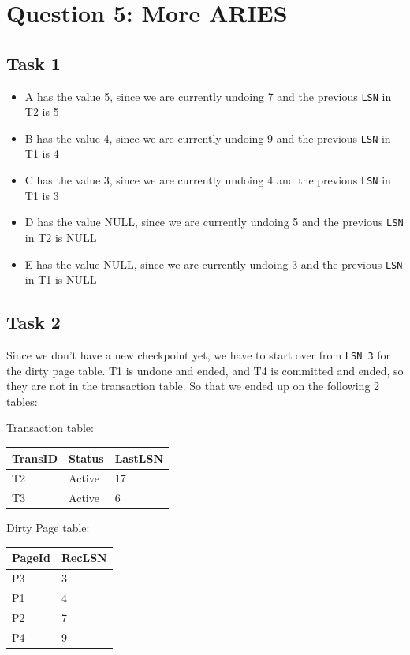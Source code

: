 \documentclass[12pt,a4paper]{article}
\begin{document}
\section{Question 5: More ARIES}
\subsection{Task 1}
\begin{itemize}
	\item A has the value 5, since we are currently undoing 7 and the previous \texttt{LSN} in T2 is 5	
	\item B has the value 4, since we are currently undoing 9 and the previous \texttt{LSN} in T1 is 4
	\item C has the value 3, since we are currently undoing 4 and the previous \texttt{LSN} in T1 is 3
	\item D has the value NULL, since we are currently undoing 5 and the previous \texttt{LSN} in T2 is NULL
	\item E has the value NULL, since we are currently undoing 3 and the previous \texttt{LSN} in T1 is NULL
\end{itemize}

\subsection{Task 2}
Since we don't have a new checkpoint yet, we have to start over from \texttt{LSN 3} for the dirty page table.
T1 is undone and ended, and T4 is committed and ended, so they are not in the transaction table.
So that we ended up on the following 2 tables:

Transaction table:
\begin{table}[!htbp]
    \centering
    \begin{tabularx}{\textwidth}{l|l|l}
        \hline
        TransID & Status & LastLSN \\ 
        \hline
        T2 & Active & 17 \\
        T3 & Active &  6 \\         
        \hline
    \end{tabularx}
\end{table}

Dirty Page table:
\begin{table}[!htbp]
    \centering
    \begin{tabularx}{\textwidth}{l|l}
        \hline
        PageId & RecLSN \\ 
        \hline
        P3 & 3 \\
        P1 & 4 \\
        P2 & 7 \\
        P4 & 9 \\         
        \hline
    \end{tabularx}
\end{table}
\end{document}
